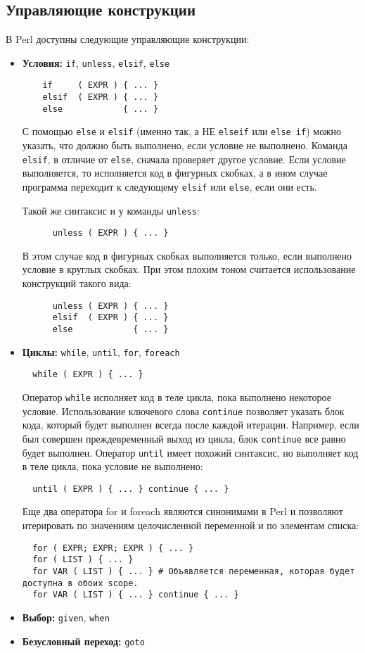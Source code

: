 \subsection{Управляющие конструкции}
В Perl доступны следующие управляющие конструкции:
\begin{itemize}
  \item \textbf{Условия:} \verb|if|, \verb|unless|, \verb|elsif|, \verb|else|
  \begin{verbatim}
    if     ( EXPR ) { ... }
    elsif  ( EXPR ) { ... }
    else            { ... }
  \end{verbatim}
  С помощью \verb|else| и \verb|elsif| (именно так, а НЕ \verb|elseif| или \verb|else if|) можно указать, что должно быть выполнено, если условие не выполнено. Команда \verb|elsif|, в отличие от \verb|else|, сначала проверяет другое условие. Если условие выполняется, то исполняется код в фигурных скобках, а в ином случае программа переходит к следующему \verb|elsif| или  \verb|else|, если они есть.

  Такой же синтаксис и у команды \verb|unless|:
  \begin{verbatim}
      unless ( EXPR ) { ... }
  \end{verbatim}
  В этом случае код в фигурных скобках выполняется только, если выполнено условие в круглых скобках. При этом плохим тоном считается использование конструкций такого вида:
  \begin{verbatim}
      unless ( EXPR ) { ... }
      elsif  ( EXPR ) { ... }
      else            { ... }
  \end{verbatim}

  \item \textbf{Циклы:} \verb|while|, \verb|until|, \verb|for|, \verb|foreach|
  \begin{verbatim}
  while ( EXPR ) { ... }
  \end{verbatim}
  Оператор \verb|while| исполняет код в теле цикла, пока выполнено некоторое условие. Использование ключевого слова \verb|continue| позволяет указать блок кода, который будет выполнен всегда после каждой итерации. Например, если был совершен преждевременный выход из цикла, блок \verb|continue| все равно будет выполнен. Оператор \verb|until| имеет похожий синтаксис, но выполняет код в теле цикла, пока условие не выполнено:
  \begin{verbatim}
  until ( EXPR ) { ... } continue { ... }
  \end{verbatim}
  Еще два оператора for и foreach являются синонимами в Perl и позволяют итерировать по значениям целочисленной переменной и по элементам списка:
  \begin{verbatim}
  for ( EXPR; EXPR; EXPR ) { ... }
  for ( LIST ) { ... }
  for VAR ( LIST ) { ... } # Объявляется переменная, которая будет доступна в обоих scope.
  for VAR ( LIST ) { ... } continue { ... }
  \end{verbatim}
  \item \textbf{Выбор:} \verb|given|, \verb|when|
  \item \textbf{Безусловный переход:}  \verb|goto|
\end{itemize}

